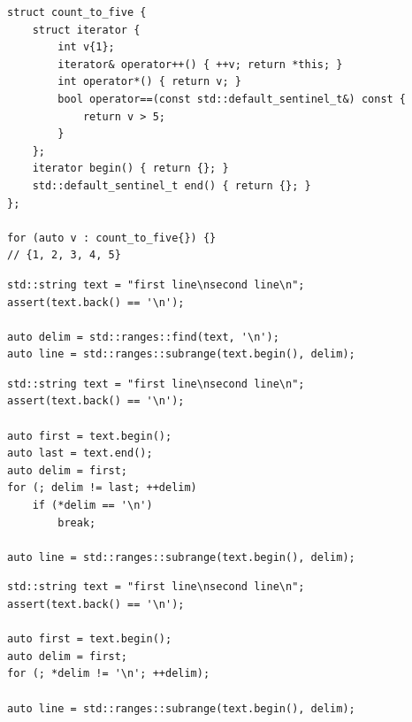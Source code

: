 \documentclass[aspectratio=169]{beamer}
\begin{document}
\begin{frame}[fragile,c]
\large
\begin{center}
\begin{verbatim}
struct count_to_five {
    struct iterator {
        int v{1};
        iterator& operator++() { ++v; return *this; }
        int operator*() { return v; }
        bool operator==(const std::default_sentinel_t&) const {
            return v > 5;
        }
    };
    iterator begin() { return {}; }
    std::default_sentinel_t end() { return {}; }
};

for (auto v : count_to_five{}) {}
// {1, 2, 3, 4, 5}
\end{verbatim}
\end{center}
\let\thefootnote\relax{}
\end{frame}

\begin{frame}[fragile,c]
\large
\begin{center}
\begin{verbatim}
std::string text = "first line\nsecond line\n";
assert(text.back() == '\n');

auto delim = std::ranges::find(text, '\n');
auto line = std::ranges::subrange(text.begin(), delim);
\end{verbatim}
\end{center}
\let\thefootnote\relax{}
\end{frame}

\begin{frame}[fragile,c]
\large
\begin{center}
\begin{verbatim}
std::string text = "first line\nsecond line\n";
assert(text.back() == '\n');

auto first = text.begin();
auto last = text.end();
auto delim = first;
for (; delim != last; ++delim)
    if (*delim == '\n')
        break;

auto line = std::ranges::subrange(text.begin(), delim);
\end{verbatim}
\end{center}
\let\thefootnote\relax{}
\end{frame}

\begin{frame}[fragile,c]
\large
\begin{center}
\begin{verbatim}
std::string text = "first line\nsecond line\n";
assert(text.back() == '\n');

auto first = text.begin();
auto delim = first;
for (; *delim != '\n'; ++delim);

auto line = std::ranges::subrange(text.begin(), delim);
\end{verbatim}
\end{center}
\let\thefootnote\relax{}
\end{frame}
\end{document}
